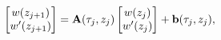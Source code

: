 \[\begin{bmatrix}w(z_{j+1})\\
w^{\prime}(z_{j+1})\end{bmatrix}=\mathbf{A}(\tau_{j},z_{j})\begin{bmatrix}w(z_%
{j})\\
w^{\prime}(z_{j})\end{bmatrix}+\mathbf{b}(\tau_{j},z_{j}),\]